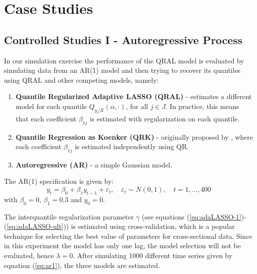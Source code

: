 \section{Case Studies}


\subsection{Controlled Studies I - Autoregressive Process} \label{sec:ar-study}


In our simulation exercise the performance of the QRAL model is evaluated by simulating data from an AR(1) model and then trying to recover its quantiles using QRAL and other competing models, namely:
\begin{enumerate}
\item \textbf{Quantile Regularized Adaptive LASSO (QRAL)} - estimates a different model for each quantile $Q_{y_t|X}(\alpha,\cdot)$, for all ${j \in J}$. In practice, this means that each coefficient $\beta_{1j}$ is estimated with regularization on each quantile. %
\item \textbf{Quantile Regression as Koenker (QRK)} - originally proposed by \cite{koenker1978regression}, where each coefficient $\beta_{1j}$ is estimated independently using QR. 
\item \textbf{Autoregressive (AR)} - a simple Gaussian model.

\end{enumerate}

The AR(1) specification is given by:
\begin{equation}
y_t = \beta_0 + \beta_1 y_{t-1} + \varepsilon_t, \quad \varepsilon_t \sim N(0, 1), \quad t=1,\dots,400 \label{eq:ar1}
\end{equation}
with $\beta_0 = 0$, $\beta_1 = 0.3$ and $y_0 = 0$. %

The interquantile regularization parameter $\gamma$ (see equations (\ref{eq:adaLASSO-1})-(\ref{eq:adaLASSO-ult})) is estimated using cross-validation, which is a popular technique for selecting the best value of parameters for cross-sectional data. 
Since in this experiment the model has only one lag, the model selection will not be evaluated, hence $\lambda=0$.
After simulating 1000 different time series given by equation (\ref{eq:ar1}), the three models are estimated.

